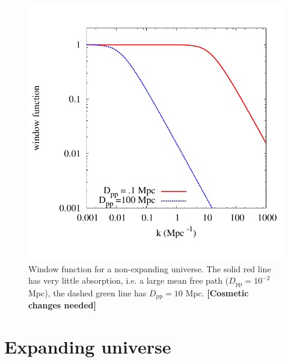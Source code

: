 \documentclass[numberedappendix]{emulateapj}
\newcommand\ALc[1]{{\color{red} \bf #1}} %
\begin{document}
{\begin{figure}
\centering
\includegraphics[width = .45\textwidth ]{newtonian_window}
\caption{Window function for a non-expanding universe. The solid red line has very little absorption, i.e. a large mean free path ($D_{\mathrm{pp}}=10^{-2}$ Mpc), the dashed green line has $D_{\mathrm{pp}}=10 $ Mpc.\ALc{[{Cosmetic changes needed}]}}
\label{fig:window_newt}
\end{figure}


\section{Expanding universe}\label{sec:window_exp}

}
\end{document}
